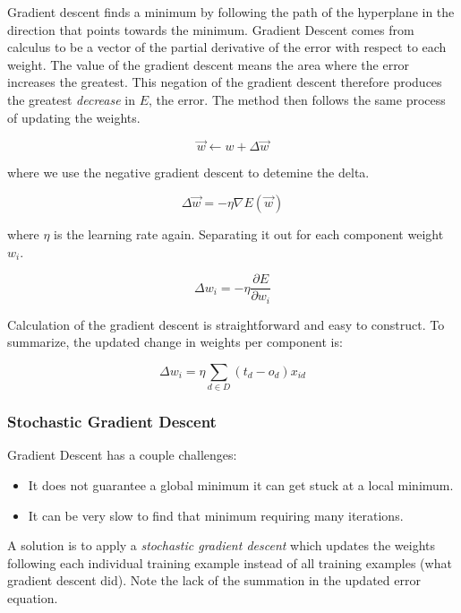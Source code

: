 \documentclass[titlepage,11pt]{article}
\begin{document}
Gradient descent finds a minimum by following the path of the hyperplane in the direction that points towards the minimum. Gradient Descent comes from calculus to be a vector of the partial derivative of the error with respect to each weight. The value of the gradient descent means the area where the error increases the greatest. This negation of the gradient descent therefore produces the greatest \textit{decrease} in $E$, the error. The method then follows the same process of updating the weights.

\begin{equation}
\vec{w} \leftarrow w + \Delta \vec{w}
\end{equation}

where we use the negative gradient descent to detemine the delta.

\begin{equation}
\Delta\vec{w} = -\eta \nabla E(\vec{w})
\end{equation}

where $\eta$ is the learning rate again. Separating it out for each component weight $w_i$.

\begin{equation}
\Delta w_i = -\eta \frac{\partial E}{\partial w_i}
\end{equation}

Calculation of the gradient descent is straightforward and easy to construct. To summarize, the updated change in weights per component  is:

\begin{equation}
\Delta w_i = \eta \sum_{d\in D} (t_d - o_d) x_{id}
\end{equation}

\subsubsection*{Stochastic Gradient Descent}

Gradient Descent has a couple challenges:

\begin{itemize}
\item It does not guarantee a global minimum it can get stuck at a local minimum.
\item It can be very slow to find that minimum requiring many iterations.
\end{itemize}

A solution is to apply a \textit{stochastic gradient descent} which updates the weights following each individual training example instead of all training examples (what gradient descent did). Note the lack of the summation in the updated error equation.
\end{document}
